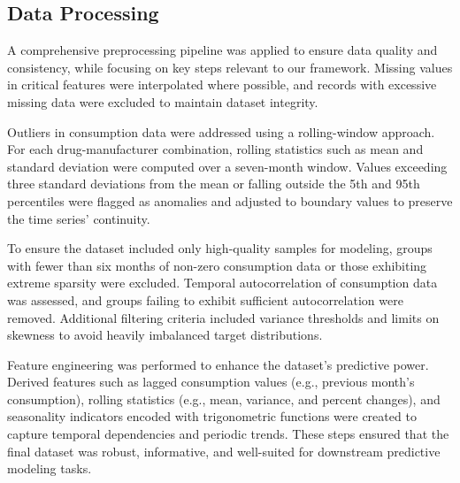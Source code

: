 \documentclass[journal]{IEEEtran}
\begin{document}
\subsection{Data Processing}
A comprehensive preprocessing pipeline was applied to ensure data quality and consistency, while focusing on key steps relevant to our framework. Missing values in critical features were interpolated where possible, and records with excessive missing data were excluded to maintain dataset integrity.

Outliers in consumption data were addressed using a rolling-window approach. For each drug-manufacturer combination, rolling statistics such as mean and standard deviation were computed over a seven-month window. Values exceeding three standard deviations from the mean or falling outside the 5th and 95th percentiles were flagged as anomalies and adjusted to boundary values to preserve the time series' continuity.

To ensure the dataset included only high-quality samples for modeling, groups with fewer than six months of non-zero consumption data or those exhibiting extreme sparsity were excluded. Temporal autocorrelation of consumption data was assessed, and groups failing to exhibit sufficient autocorrelation were removed. Additional filtering criteria included variance thresholds and limits on skewness to avoid heavily imbalanced target distributions.

Feature engineering was performed to enhance the dataset's predictive power. Derived features such as lagged consumption values (e.g., previous month’s consumption), rolling statistics (e.g., mean, variance, and percent changes), and seasonality indicators encoded with trigonometric functions were created to capture temporal dependencies and periodic trends. These steps ensured that the final dataset was robust, informative, and well-suited for downstream predictive modeling tasks.
\end{document}
